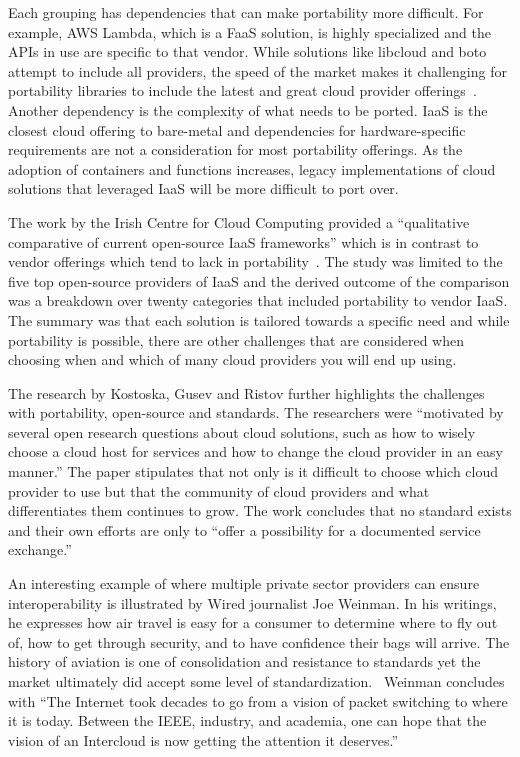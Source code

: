 Each grouping has dependencies that can make portability more difficult. For
example, AWS Lambda, which is a FaaS solution, is highly specialized and the
APIs in use are specific to that vendor. While solutions like libcloud and boto
attempt to include all providers, the speed of the market makes it challenging
for portability libraries to include the latest and great cloud provider
offerings~\cite{hid-sp18-518-LibCloud}. Another dependency is the complexity of
what needs to be ported. IaaS is the closest cloud offering to bare-metal and
dependencies for hardware-specific requirements are not a consideration for
most
portability offerings. As the adoption of containers and functions increases,
legacy implementations of cloud solutions that leveraged IaaS will be more
difficult to port over. 

The work by the Irish Centre for Cloud Computing provided a ``qualitative
comparative of current  open-source  IaaS frameworks'' which is in contrast to
vendor offerings which tend to lack in
portability~\cite{hid-sp18-518-Comp-study}. The study was limited to the five
top open-source providers of IaaS and the derived outcome of the comparison was
a breakdown over twenty categories that included portability to vendor IaaS.
The
summary was that each solution is tailored towards a specific need and while
portability is possible, there are other challenges that are considered when
choosing when and which of many cloud providers you will end up using.

The research by Kostoska, Gusev and Ristov further highlights the
challenges with portability, open-source and standards. The
researchers were ``motivated by several open research questions about
cloud solutions, such as how to wisely choose a cloud host for
services and how to change the cloud provider in an easy
manner.''\cite{hid-sp18-518-Kostoska-Gusev-Ristov} The paper
stipulates that not only is it difficult to choose which cloud
provider to use but that the community of cloud providers and what
differentiates them continues to grow. The work concludes that no
standard exists and their own efforts are only to ``offer a
possibility for a documented service exchange.''

An interesting example of where multiple private sector providers can ensure
interoperability is illustrated by Wired journalist Joe Weinman. In his
writings, he expresses how air travel is easy for a consumer to determine where
to fly out of, how to get through security, and to have confidence their bags
will arrive. The history of aviation is one of consolidation and resistance to
standards yet the market ultimately did accept some level of
standardization.~\cite{hid-sp18-518-Wired} Weinman concludes with ``The
Internet
took decades to go from a vision of packet switching to where it is today. 
Between the IEEE, industry, and academia, one can hope that the vision of an
Intercloud is now getting the attention it deserves.''

